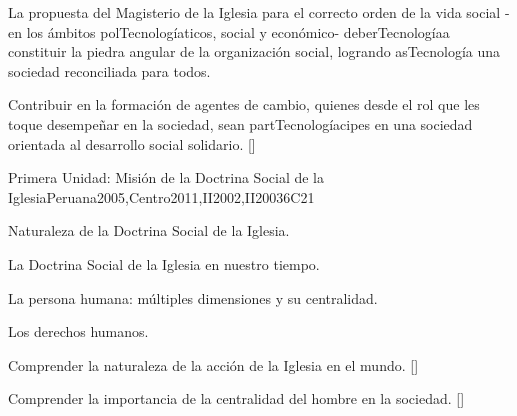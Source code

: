 \begin{syllabus}


\begin{justification}
La propuesta del Magisterio de la Iglesia para el correcto orden de la vida social -en los ámbitos polTecnologíaticos, social y económico- deberTecnologíaa constituir la piedra angular de la organización social, logrando asTecnología una sociedad reconciliada para todos.
\end{justification}

\begin{goals}
\item Contribuir en la formación de agentes de cambio, quienes desde el rol que les toque desempeñar en la sociedad, sean partTecnologíacipes en una sociedad orientada al desarrollo social solidario. [\Usage]
\end{goals}

\begin{outcomes}
    \item {}
    \item {}
    \item {}
\end{outcomes}

\begin{competences}
    \item {}
    \item {}
    \item {}
\end{competences}

\begin{unit}{}{Primera Unidad: Misión de la Doctrina Social de la Iglesia}{Peruana2005,Centro2011,II2002,II2003}{6}{C21}
\begin{topics}
	\item Naturaleza de la Doctrina Social de la Iglesia.
	\item La Doctrina Social de la Iglesia en nuestro tiempo.
	\item La persona humana: múltiples dimensiones y su centralidad.
	\item Los derechos humanos.
\end{topics}
\begin{learningoutcomes}
	\item Comprender la naturaleza de la acción de la Iglesia en el mundo. [\Familiarity]
	\item Comprender la importancia de la centralidad del hombre en la sociedad. [\Familiarity]
\end{learningoutcomes}
\end{unit}


\end{syllabus}
